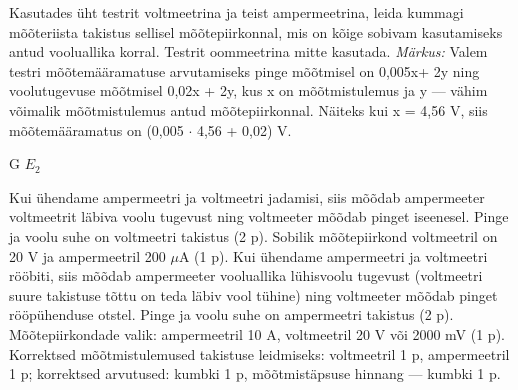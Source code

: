 
Kasutades üht testrit voltmeetrina ja teist ampermeetrina, leida kummagi mõõteriista takistus sellisel mõõtepiirkonnal, mis on kõige sobivam kasutamiseks antud vooluallika korral. Testrit oommeetrina mitte kasutada.
\textit{Märkus:} Valem testri mõõtemääramatuse arvutamiseks pinge mõõtmisel on 0,005x+ 2y ning voolutugevuse mõõtmisel 0,02x + 2y, kus x on mõõtmistulemus ja y --- vähim võimalik mõõtmistulemus antud mõõtepiirkonnal. Näiteks kui x = 4,56 V, siis mõõtemääramatus on (0,005 $\cdot$ 4,56 + 0,02) V.

\hint

\solu
G $E_2$

Kui ühendame ampermeetri ja voltmeetri jadamisi, siis mõõdab ampermeeter voltmeetrit läbiva voolu tugevust ning voltmeeter mõõdab pinget iseenesel. Pinge ja voolu suhe on voltmeetri takistus (2 p). Sobilik mõõtepiirkond voltmeetril on 20 V ja ampermeetril 200 $\mu$A (1 p). Kui ühendame ampermeetri ja voltmeetri rööbiti, siis mõõdab ampermeeter vooluallika lühisvoolu tugevust (voltmeetri suure takistuse tõttu on teda läbiv vool tühine) ning voltmeeter mõõdab pinget rööpühenduse otstel. Pinge ja voolu suhe on ampermeetri takistus (2 p). Mõõtepiirkondade valik: ampermeetril 10 A, voltmeetril 20 V või 2000 mV (1 p). Korrektsed mõõtmistulemused takistuse leidmiseks: voltmeetril 1 p, ampermeetril 1 p; korrektsed arvutused: kumbki 1 p, mõõtmistäpsuse hinnang --- kumbki 1 p.
\probend
